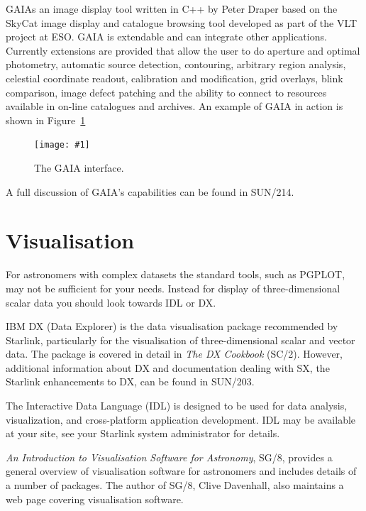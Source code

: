 \documentclass[twoside,11pt]{article}
\newcommand{\htmladdnormallink}[2]{#1}
\newcommand{\htmladdimg}[1]{}
\newcommand{\xref}[3]{#1}
\newcommand{\xlabel}[1]{}
\newcommand{\myfig} [5] {
  \begin{figure}
    \centering\texttt{[image: \#1]}
    \typeout{#1 inserted on page \arabic{page}}
    \caption{\label{#4}#5}
  \end{figure}
  }
\newcommand{\myfig}[5]{
    \label{#4} \htmladdimg{#3}\\
    Figure: #5\\
    }
\begin{document}
\xref{GAIA}{sun214} is an image display tool written in C++ by \htmladdnormallink{Peter Draper}{mailto:P.W.Draper@durham.ac.uk} based on the \htmladdnormallink{SkyCat}{http://archive.eso.org/skycat/} image display and catalogue browsing tool developed as part of the \htmladdnormallink{VLT}{http://www.eso.org/vlt/} project at \htmladdnormallink{ESO}{http://www.eso.org/}. GAIA is extendable and can integrate other applications. Currently extensions are provided that allow the user to do aperture and optimal photometry, automatic source detection, contouring, arbitrary region analysis, celestial coordinate readout, calibration and modification, grid overlays, blink comparison, image defect patching and the
ability to connect to resources available in on-line catalogues and archives. An example of GAIA in action is shown in Figure~\ref{sc15_gaia_interface}

\myfig{sc15_gaia.eps}{height=0.7\textheight}{sc15_gaia.gif}{sc15_gaia_interface}{The GAIA interface.} 

A full discussion of GAIA's capabilities can be found in \xref{SUN/214}{sun214}{}.

\section{\xlabel{sc15_visualisation}Visualisation\label{sc15_visualisation}}

For astronomers with complex datasets the standard tools, such as PGPLOT, may not be sufficient for your needs. Instead for display of three-dimensional scalar data you should look towards IDL or DX.

IBM DX (Data Explorer) is the data visualisation package recommended by Starlink, particularly for the visualisation of three-dimensional scalar and
vector data. The package is covered in detail in \xref{{\em The DX Cookbook} (SC/2)}{sc2}{}. However, additional information about DX and documentation dealing with SX, the Starlink enhancements to DX, can be found in \xref{SUN/203}{sun203}{}.

The \htmladdnormallink{Interactive Data Language}{http://www.rsinc.com/idl/index.cfm} (IDL) is designed to be used for data analysis, visualization, and cross-platform application development. IDL may be available at your site, see your Starlink system administrator for details.

\xref{{\em An Introduction to Visualisation Software for Astronomy}}{sg8}{}, SG/8, provides a general overview of visualisation software for astronomers and includes details of a number of packages. The author of SG/8, \htmladdnormallink{Clive Davenhall}{mailto:acd@roe.ac.uk},  also maintains a \htmladdnormallink{web page}{http://www.roe.ac.uk/~acd/vissys/index.html} covering visualisation software.
\end{document}
